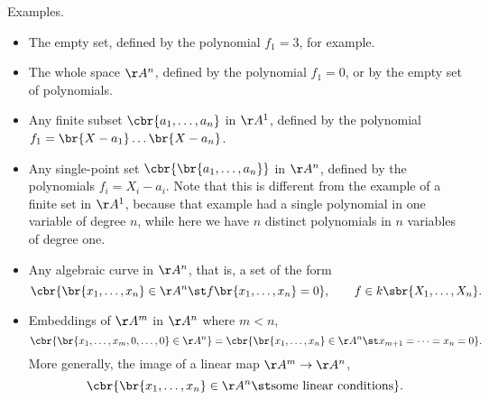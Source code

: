 \begin{example*}
Examples.
\begin{itemize}
\item The empty set, defined by the polynomial $ f_1 = 3 $, for example.
\item The whole space $ \AA^n $, defined by the polynomial $ f_1 = 0 $, or by the empty set of polynomials.
\item Any finite subset $ \cbr{a_1, \dots, a_n} $ in $ \AA^1 $, defined by the polynomial $ f_1 = \br{X - a_1} \dots \br{X - a_n} $.
\item Any single-point set $ \cbr{\br{a_1, \dots, a_n}} $ in $ \AA^n $, defined by the polynomials $ f_i = X_i - a_i $. Note that this is different from the example of a finite set in $ \AA^1 $, because that example had a single polynomial in one variable of degree $ n $, while here we have $ n $ distinct polynomials in $ n $ variables of degree one.
\item Any algebraic curve in $ \AA^n $, that is, a set of the form
$$ \cbr{\br{x_1, \dots, x_n} \in \AA^n \st f\br{x_1, \dots, x_n} = 0}, \qquad f \in k\sbr{X_1, \dots, X_n}. $$
\item Embeddings of $ \AA^m $ in $ \AA^n $ where $ m < n $,
$$ \cbr{\br{x_1, \dots, x_m, 0, \dots, 0} \in \AA^n} = \cbr{\br{x_1, \dots, x_n} \in \AA^n \st x_{m + 1} = \dots = x_n = 0}. $$
More generally, the image of a linear map $ \AA^m \to \AA^n $,
$$ \cbr{\br{x_1, \dots, x_n} \in \AA^n \st \text{some linear conditions}}. $$
\end{itemize}
\end{example*}

\pagebreak

